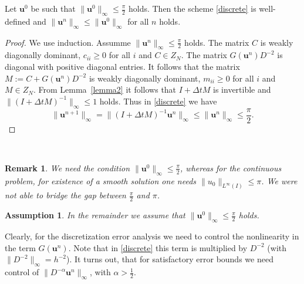 \documentclass{siamltex}
\newcommand{\bu}{\mathbf u}
\newtheorem{assumption}{Assumption}[section]
\newtheorem{remark}{Remark}[section]
\begin{document}
{\begin{lemma} \label{lemma3}
 Let $\bu^0$ be such that $\|\bu^0\|_\infty \leq \frac{\pi}{2}$ holds. Then the scheme \eqref{discrete} is well-defined  and $\|\bu^n\|_\infty \leq \|\bu^0\|_\infty$ for all $n$ holds. 
\end{lemma}
\begin{proof} We use induction. Assumme $\|\bu^n\|_\infty \leq \frac{\pi}{2}$ holds. The matrix $C$ is weakly diagonally dominant, $c_{ii} \geq 0$ for all $i$ and $C \in Z_N$. The matrix $G(\bu^n)D^{-2}$ is diagonal with positive diagonal entries. It follows that the matrix $M:= C +G(\bu^n)D^{-2}$ is weakly diagonally dominant, $m_{ii} \geq 0$ for all $i$ and $M \in Z_N$. From Lemma~\ref{lemma2} it follows that $I+\Delta t M$ is invertible and $\|(I+ \Delta t M)^{-1}\|_\infty \leq 1$ holds. Thus in \eqref{discrete} we have
\[
 \|\bu^{n+1}\|_{\infty} = \|(I+ \Delta t M)^{-1}\bu^n\|_\infty \leq \|\bu^n\|_\infty \leq \frac{\pi}{2}.
\]
\end{proof}
\ \\
\begin{remark} \rm We need the condition $\|\bu^0\|_\infty \leq \frac{\pi}{2}$, whereas for the continuous problem, for existence of a smooth solution one needs $\|u_0\|_{L^\infty(I)} \leq \pi$.  We were not able to bridge the gap between $\frac{\pi}{2}$  and $\pi$. 
\end{remark}
\begin{assumption} \label{assump:Initial_cond} \rm In the remainder we assume that $\|\bu^0\|_\infty \leq \frac{\pi}{2}$ holds.
\end{assumption}

Clearly, for the discretization error analysis we need to control the nonlinearity in the term $G(\bu^n)$. Note that in \eqref{discrete} this term is multiplied by $D^{-2}$ (with $\|D^{-2}\|_\infty= h^{-2}$). It turns out, that for satisfactory error bounds we need control of $\|D^{-\alpha}\bu^n\|_\infty$, with $\alpha > \tfrac12$. 

}
\end{document}
